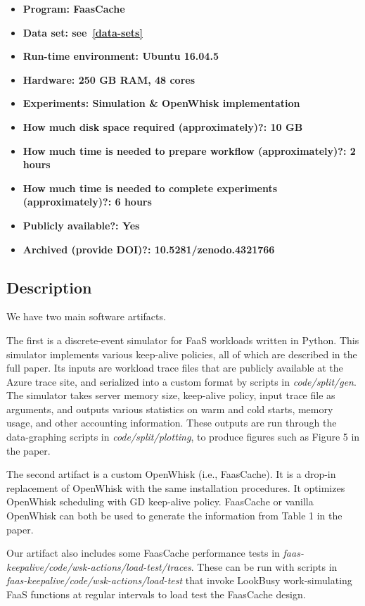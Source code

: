 {\small
\begin{itemize}
  \item {\bf Program: FaasCache }
  \item {\bf Data set: see~\ref{data-sets} }
  \item {\bf Run-time environment:  Ubuntu 16.04.5 }
  \item {\bf Hardware: 250 GB RAM, 48 cores }
  \item {\bf Experiments: Simulation \& OpenWhisk implementation }
  \item {\bf How much disk space required (approximately)?: 10 GB }
  \item {\bf How much time is needed to prepare workflow (approximately)?: 2 hours }
  \item {\bf How much time is needed to complete experiments (approximately)?: 6 hours }
  \item {\bf Publicly available?: Yes }
  \item {\bf Archived (provide DOI)?: 10.5281/zenodo.4321766 }
\end{itemize}

\subsection{Description}

We have two main software artifacts.

The first is a discrete-event simulator for FaaS workloads written in Python.
This simulator implements various keep-alive policies, all of which are described in the full paper.
Its inputs are workload trace files that are publicly available at the Azure trace site, and serialized into a custom format by scripts in {\em code/split/gen}.
The simulator takes server memory size, keep-alive policy, input trace file as arguments, and outputs various statistics on warm and cold starts, memory usage, and other accounting information. 
These outputs are run through the data-graphing scripts in {\em code/split/plotting}, to produce figures such as Figure 5 in the paper.

The second artifact is a custom OpenWhisk (i.e., FaasCache).
It is a drop-in replacement of OpenWhisk with the same installation procedures.
It optimizes OpenWhisk scheduling with GD keep-alive policy.
FaasCache or vanilla OpenWhisk can both be used to generate the information from Table 1 in the paper.

Our artifact also includes some FaasCache performance tests in {\em faas-keepalive/code/wsk-actions/load-test/traces}.
These can be run with scripts in {\em faas-keepalive/code/wsk-actions/load-test} that invoke LookBusy work-simulating FaaS functions at regular intervals to load test the FaasCache design.

}
